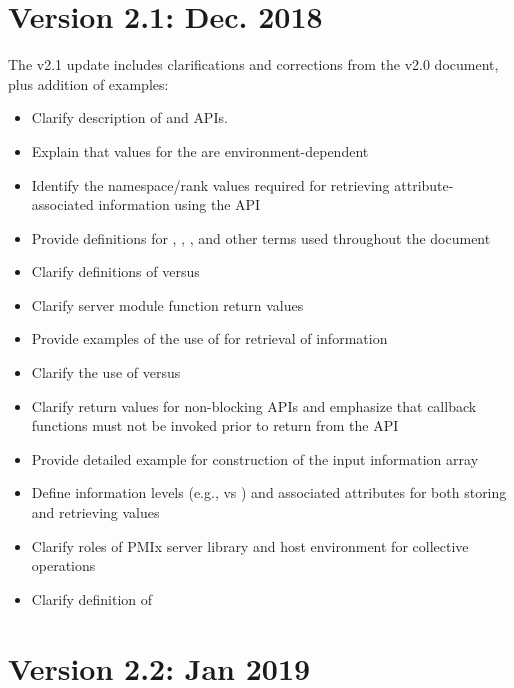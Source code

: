 \section{Version 2.1: Dec. 2018}

The v2.1 update includes clarifications and corrections from the v2.0 document, plus addition of examples:

\begin{itemize}
    \item Clarify description of  and  \acp{API}.
    \item Explain that values for the  are environment-dependent
    \item Identify the namespace/rank values required for retrieving attribute-associated information using the  \ac{API}
    \item Provide definitions for , , , and other terms used throughout the document
    \item Clarify definitions of  versus 
    \item Clarify server module function return values
    \item Provide examples of the use of  for retrieval of information
    \item Clarify the use of  versus 
    \item Clarify return values for non-blocking \acp{API} and emphasize that callback functions must not be invoked prior to return from the \ac{API}
    \item Provide detailed example for construction of the  input information array
    \item Define information levels (e.g.,  vs ) and associated attributes for both storing and retrieving values
    \item Clarify roles of \ac{PMIx} server library and host environment for collective operations
    \item Clarify definition of 
\end{itemize}


\section{Version 2.2: Jan 2019}

